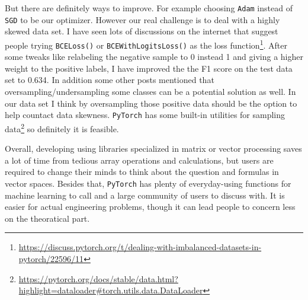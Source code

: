 \documentclass[11pt]{article} %
\begin{document}
But there are definitely ways to improve. For example choosing \verb|Adam| instead of \verb|SGD| to be our optimizer. However our real challenge is to deal with a highly skewed data set. I have seen lots of discussions on the internet that suggest people trying \verb|BCELoss()| or \verb|BCEWithLogitsLoss()| as the loss function\footnote{\url{https://discuss.pytorch.org/t/dealing-with-imbalanced-datasets-in-pytorch/22596/11}}. After some tweaks like relabeling the negative sample to 0 instead 1 and giving a higher weight to the positive labels, I have improved the the F1 score on the test data set to 0.634. In addition some other posts mentioned that oversampling/undersampling some classes can be a potential solution as well. In our data set I think by oversampling those positive data should be the option to help countact data skewness. \verb|PyTorch| has some built-in utilities for sampling data\footnote{\url{https://pytorch.org/docs/stable/data.html?highlight=dataloader#torch.utils.data.DataLoader}} so definitely it is feasible.

Overall, developing using libraries specialized in matrix or vector processing saves a lot of time from tedious array operations and calculations, but users are required to change their minds to think about the question and formulas in vector spaces. Besides that, \verb|PyTorch| has plenty of everyday-using functions for machine learning to call and a large community of users to discuss with. It is easier for actual engineering problems, though it can lead people to concern less on the theoratical part.
\end{document}

